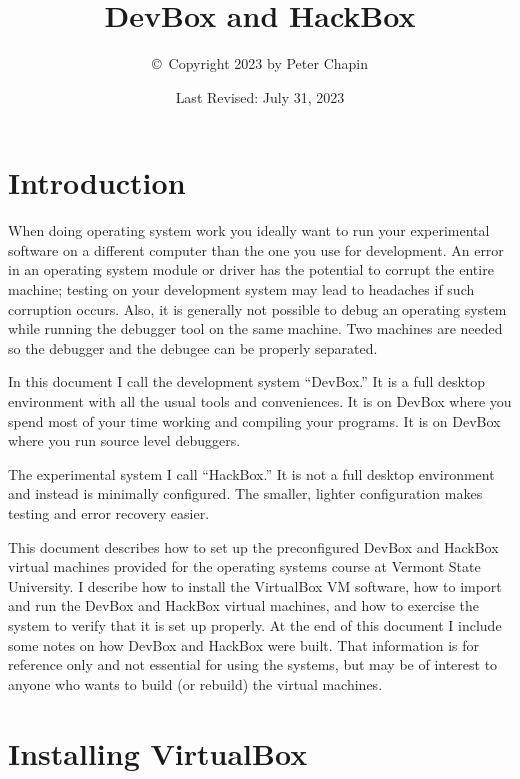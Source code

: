 \documentclass[twocolumn]{article}
\begin{document}
\title{DevBox and HackBox}
\author{\copyright\ Copyright 2023 by Peter Chapin}
\date{Last Revised: July 31, 2023}
\maketitle

\tableofcontents

\section{Introduction}

When doing operating system work you ideally want to run your experimental software on a
different computer than the one you use for development. An error in an operating system module
or driver has the potential to corrupt the entire machine; testing on your development system
may lead to headaches if such corruption occurs. Also, it is generally not possible to debug an
operating system while running the debugger tool on the same machine. Two machines are needed so
the debugger and the debugee can be properly separated.

In this document I call the development system ``DevBox.'' It is a full desktop environment with
all the usual tools and conveniences. It is on DevBox where you spend most of your time working
and compiling your programs. It is on DevBox where you run source level debuggers.

The experimental system I call ``HackBox.'' It is not a full desktop environment and instead is
minimally configured. The smaller, lighter configuration makes testing and error recovery
easier.

This document describes how to set up the preconfigured DevBox and HackBox virtual machines
provided for the operating systems course at Vermont State University. I describe how to install
the VirtualBox VM software, how to import and run the DevBox and HackBox virtual machines, and
how to exercise the system to verify that it is set up properly. At the end of this document I
include some notes on how DevBox and HackBox were built. That information is for reference only
and not essential for using the systems, but may be of interest to anyone who wants to build (or
rebuild) the virtual machines.

\section{Installing VirtualBox}
\end{document}
